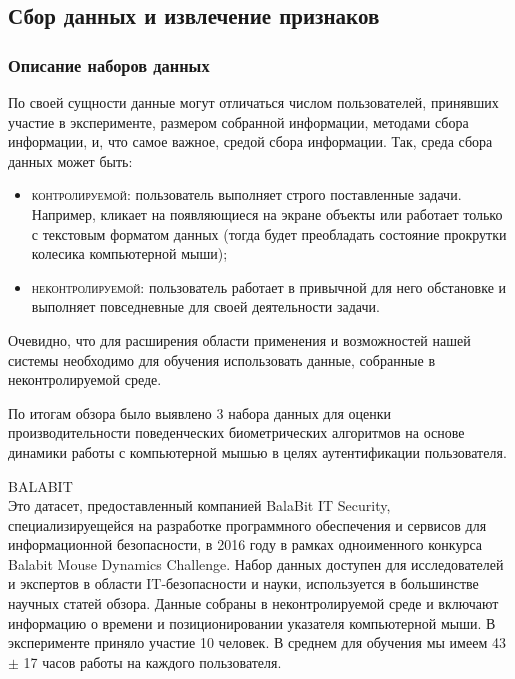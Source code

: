 \documentclass[12pt]{article}
\begin{document}
    \subsection{Сбор данных и извлечение признаков}
    \label{sec:Research:Data}

    \subsubsection{Описание наборов данных}
    \label{sec:Research:Data:Description}

    \par По своей сущности данные могут отличаться числом пользователей, принявших участие в эксперименте, размером собранной информации, методами сбора информации, и, что самое важное, средой сбора информации. Так, среда сбора данных может быть:

    \begin{itemize}
        \item \textsc{контролируемой}: пользователь выполняет строго поставленные задачи. Например, кликает на появляющиеся на экране объекты или работает только с текстовым форматом данных (тогда будет преобладать состояние прокрутки колесика компьютерной мыши);
        \item \textsc{неконтролируемой}: пользователь работает в привычной для него обстановке и выполняет повседневные для своей деятельности задачи.
    \end{itemize}

    \par Очевидно, что для расширения области применения и возможностей нашей системы необходимо для обучения использовать данные, собранные в неконтролируемой среде. \\

    \par По итогам обзора было выявлено 3 набора данных для оценки производительности поведенческих биометрических алгоритмов на основе динамики работы с компьютерной мышью в целях аутентификации пользователя. \\

    \par \textsc{BALABIT} \cite{BALABIT} \\
    \noindent Это датасет, предоставленный компанией BalaBit IT Security, специализируещейся на разработке программного обеспечения и сервисов для информационной безопасности, в 2016 году в рамках одноименного конкурса Balabit Mouse Dynamics Challenge. Набор данных доступен для исследователей и экспертов в области IT-безопасности и науки, используется в большинстве научных статей обзора. Данные собраны в неконтролируемой среде и включают информацию о времени и позиционировании указателя компьютерной мыши. В эксперименте приняло участие 10 человек. В среднем для обучения мы имеем 43 $\pm$ 17 часов работы на каждого пользователя. \\
\end{document}
